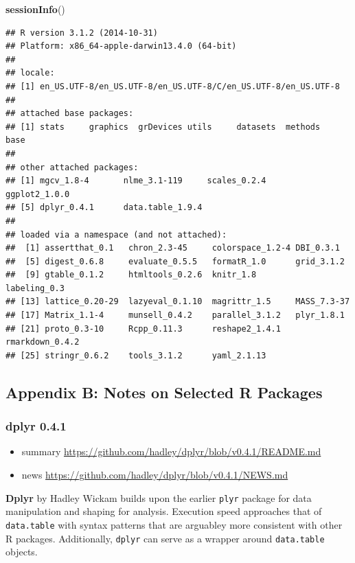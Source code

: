 \documentclass[]{article}
\newenvironment{Shaded}{\begin{snugshade}}{\end{snugshade}}
\newcommand{\KeywordTok}[1]{\textcolor[rgb]{0.13,0.29,0.53}{\textbf{{#1}}}}
\newcommand{\NormalTok}[1]{{#1}}
\begin{document}
\begin{Shaded}
\begin{Highlighting}[]
\KeywordTok{sessionInfo}\NormalTok{()}
\end{Highlighting}
\end{Shaded}

\begin{verbatim}
## R version 3.1.2 (2014-10-31)
## Platform: x86_64-apple-darwin13.4.0 (64-bit)
## 
## locale:
## [1] en_US.UTF-8/en_US.UTF-8/en_US.UTF-8/C/en_US.UTF-8/en_US.UTF-8
## 
## attached base packages:
## [1] stats     graphics  grDevices utils     datasets  methods   base     
## 
## other attached packages:
## [1] mgcv_1.8-4       nlme_3.1-119     scales_0.2.4     ggplot2_1.0.0   
## [5] dplyr_0.4.1      data.table_1.9.4
## 
## loaded via a namespace (and not attached):
##  [1] assertthat_0.1   chron_2.3-45     colorspace_1.2-4 DBI_0.3.1       
##  [5] digest_0.6.8     evaluate_0.5.5   formatR_1.0      grid_3.1.2      
##  [9] gtable_0.1.2     htmltools_0.2.6  knitr_1.8        labeling_0.3    
## [13] lattice_0.20-29  lazyeval_0.1.10  magrittr_1.5     MASS_7.3-37     
## [17] Matrix_1.1-4     munsell_0.4.2    parallel_3.1.2   plyr_1.8.1      
## [21] proto_0.3-10     Rcpp_0.11.3      reshape2_1.4.1   rmarkdown_0.4.2 
## [25] stringr_0.6.2    tools_3.1.2      yaml_2.1.13
\end{verbatim}

\subsection{Appendix B: Notes on Selected R
Packages}\label{appendix-b-notes-on-selected-r-packages}

\subsubsection{dplyr 0.4.1}\label{dplyr-0.4.1}

\begin{itemize}
\itemsep1pt\parskip0pt
\item
  summary \url{https://github.com/hadley/dplyr/blob/v0.4.1/README.md}
\item
  news \url{https://github.com/hadley/dplyr/blob/v0.4.1/NEWS.md}
\end{itemize}

\textbf{Dplyr} by Hadley Wickam builds upon the earlier \texttt{plyr}
package for data manipulation and shaping for analysis. Execution speed
approaches that of \texttt{data.table} with syntax patterns that are
arguabley more consistent with other R packages. Additionally,
\texttt{dplyr} can serve as a wrapper around \texttt{data.table}
objects.
\end{document}
